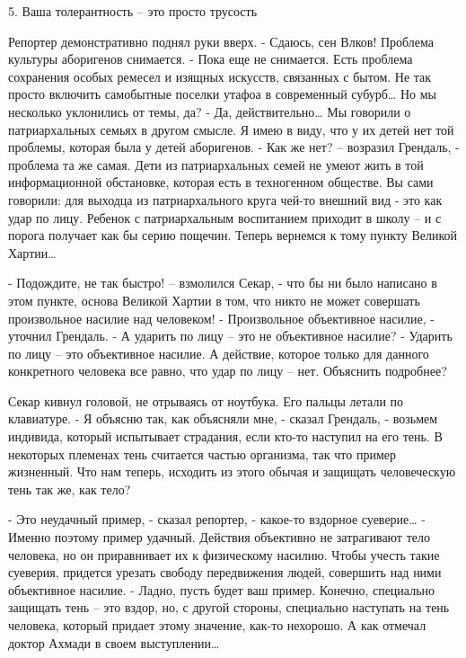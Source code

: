 \documentclass{book}
\begin{document}
5. Ваша толерантность -- это просто трусость


Репортер демонстративно поднял руки вверх.
- Сдаюсь, сен Влков! Проблема культуры аборигенов снимается.
- Пока еще не снимается. Есть проблема сохранения особых ремесел и изящных искусств, связанных с бытом. Не так просто включить самобытные поселки утафоа в современный субурб\ldots{} Но мы несколько уклонились от темы, да?
- Да, действительно\ldots{} Мы говорили о патриархальных семьях в другом смысле. Я имею в виду, что у их детей нет той проблемы, которая была у детей аборигенов.
- Как же нет? -- возразил Грендаль, - проблема та же самая. Дети из патриархальных семей не умеют жить в той информационной обстановке, которая есть в техногенном обществе. Вы сами говорили: для выходца из патриархального круга чей-то внешний вид - это как удар по лицу. Ребенок с патриархальным воспитанием приходит в школу -- и с порога получает как бы серию пощечин. Теперь вернемся к тому пункту Великой Хартии\ldots{}

- Подождите, не так быстро! -- взмолился Секар, - что бы ни было написано в этом пункте, основа Великой Хартии в том, что никто не может совершать произвольное насилие над человеком!
- Произвольное объективное насилие, - уточнил Грендаль.
- А ударить по лицу -- это не объективное насилие?
- Ударить по лицу -- это объективное насилие. А действие, которое только для данного конкретного человека все равно, что удар по лицу -- нет. Объяснить подробнее?

Секар кивнул головой, не отрываясь от ноутбука. Его пальцы летали по клавиатуре.
- Я объясню так, как объясняли мне, - сказал Грендаль, - возьмем индивида, который испытывает страдания, если кто-то наступил на его тень. В некоторых племенах тень считается частью организма, так что пример жизненный. Что нам теперь, исходить из этого обычая и защищать человеческую тень так же, как тело?

- Это неудачный пример, - сказал репортер, - какое-то вздорное суеверие\ldots{}
- Именно поэтому пример удачный. Действия объективно не затрагивают тело человека, но он приравнивает их к физическому насилию. Чтобы учесть такие суеверия, придется урезать свободу передвижения людей, совершить над ними объективное насилие.
- Ладно, пусть будет ваш пример. Конечно, специально защищать тень -- это вздор, но, с другой стороны, специально наступать на тень человека, который придает этому значение, как-то нехорошо. А как отмечал доктор Ахмади в своем выступлении\ldots{}
\end{document}
